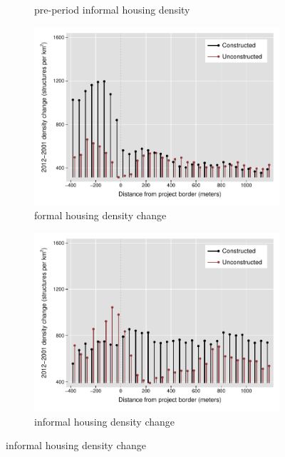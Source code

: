 \documentclass[12pt]{article}
\begin{document}
\begin{figure}[t!]
\begin{subfigure}[b]{0.495\textwidth}
            \caption[]%
            {{\small pre-period informal housing density}}    
            \label{fig:preinf}
        \end{subfigure}
        \vskip 1mm \vskip 0pt
        \begin{subfigure}[b]{0.495\textwidth}   
            \centering 
            \includegraphics[width=\textwidth,trim={0.3cm .3cm 0.1cm 0cm}, clip=true]{figures/bblu_for_rawchanges}
            \caption[]%
            {{\small formal housing density change}}    
            \label{fig:forchange}
        \end{subfigure}
        \hfill
        \begin{subfigure}[b]{0.495\textwidth}   
            \centering 
            \includegraphics[width=\textwidth,trim={0.3cm .3cm 0.1cm 0cm}, clip=true]{figures/bblu_inf_rawchanges}
            \caption[]%
            {{\small informal housing density change}}    
            \label{fig:infchange}
        \end{subfigure}
        \label{fig:rawbblumeans}
    \end{figure} 
 
\end{document}
